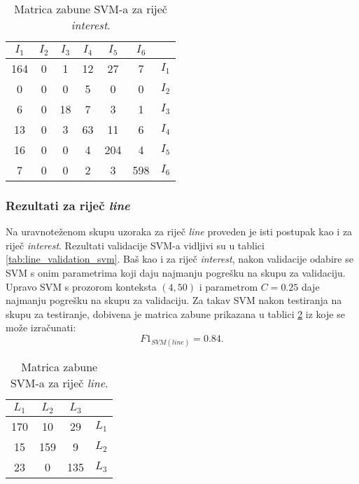 \documentclass[10pt, a4paper]{article}
\begin{document}
\begin{table}[!hbtp]
\caption{Matrica zabune SVM-a za riječ \emph{interest}.}
\label{tab:interest_confusion_svm}
\begin{center}
\begin{tabular}{|cccccc|c|}
\hline
$I_1$ & $I_2$ & $I_3$ & $I_4$ & $I_5$ & $I_6$ &  \\
\hline
 164 & 0 &  1 & 12 & 27 &  7 & $I_1$  \\
   0 & 0 &  0 &  5 &  0 &  0 & $I_2$  \\
   6 & 0 & 18 &  7 &  3 &  1 & $I_3$  \\
  13 & 0 & 3  & 63 & 11 &  6 & $I_4$  \\
  16 & 0 & 0  & 4  &204 &  4 & $I_5$  \\
   7 & 0 & 0  & 2  &  3 & 598  &$I_6$  \\
\hline
\end{tabular}
\end{center}
\end{table}
\subsubsection{Rezultati za riječ \emph{line}} 
Na uravnoteženom skupu uzoraka za riječ \emph{line} proveden
je isti postupak kao i za riječ \emph{interest}. 
Rezultati validacije SVM-a vidljivi su u tablici \ref{tab:line_validation_svm}.
Baš kao i za riječ \emph{interest}, nakon validacije odabire se
SVM s onim parametrima koji daju najmanju pogrešku na skupu za validaciju.
Upravo SVM s prozorom konteksta $(4,50)$ i parametrom $C = 0.25$ daje 
najmanju pogrešku na skupu za validaciju.
Za takav SVM nakon testiranja na skupu za testiranje, dobivena
je matrica zabune prikazana u tablici \ref{tab:line_confusion_svm}
iz koje se može izračunati:
\begin{equation}
\label{eq:f1_svm_line}
F1_{SVM(line)} = 0.84.
\end{equation}

\begin{table}[!hbtp]
\caption{Matrica zabune SVM-a za riječ \emph{line}.}
\label{tab:line_confusion_svm}
\begin{center}
\begin{tabular}{|ccc|c|}
\hline
$L_1$ & $L_2$ & $L_3$ &  \\
\hline
 170  & 10  & 29 & $L_1$ \\
  15  & 159  & 9 & $L_2$ \\
  23  & 0  & 135 & $L_3$ \\
\hline
\end{tabular}
\end{center}
\end{table}
\end{document}
